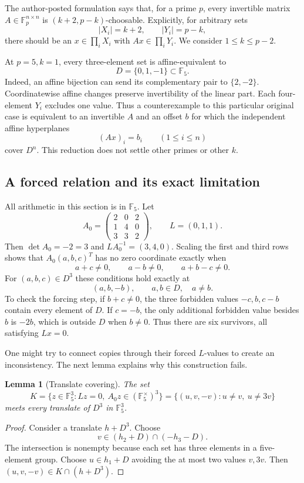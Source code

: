 \documentclass[11pt,a4paper]{article}
\newtheorem{lemma}[theorem]{Lemma}
\newcommand{\F}{\mathbb F_5}
\begin{document}
The author-posted formulation \cite{DeVos} says that, for a prime $p$,
every invertible matrix $A\in\mathbb F_p^{n\times n}$ is
$(k+2,p-k)$-choosable. Explicitly, for arbitrary sets
\[
 |X_i|=k+2,\qquad |Y_i|=p-k,
\]
there should be an $x\in\prod_i X_i$ with $Ax\in\prod_i Y_i$.
We consider $1\le k\le p-2$.

At $p=5,k=1$, every three-element set is affine-equivalent to
\[
 D=\{0,1,-1\}\subset\F.
\]
Indeed, an affine bijection can send its complementary pair to
$\{2,-2\}$. Coordinatewise affine changes preserve invertibility of the
linear part. Each four-element $Y_i$ excludes one value. Thus a
counterexample to this particular original case is equivalent to an
invertible $A$ and an offset $b$ for which the independent affine
hyperplanes
\[
 (Ax)_i=b_i\qquad(1\le i\le n)
\]
cover $D^n$. This reduction does not settle other primes or other $k$.

\subsection{A forced relation and its exact limitation}

All arithmetic in this section is in $\F$. Let
\begin{equation}\label{eq:gadget}
 A_0=\begin{pmatrix}2&0&2\\1&4&0\\3&3&2\end{pmatrix},
 \qquad L=(0,1,1).
\end{equation}
Then $\det A_0=-2=3$ and $LA_0^{-1}=(3,4,0)$.
Scaling the first and third rows shows that $A_0(a,b,c)^T$ has no zero
coordinate exactly when
\[
 a+c\ne0,\qquad a-b\ne0,\qquad a+b-c\ne0.
\]
For $(a,b,c)\in D^3$ these conditions hold exactly at
\begin{equation}\label{eq:six}
 (a,b,-b),\qquad a,b\in D,\quad a\ne b.
\end{equation}
To check the forcing step, if $b+c\ne0$, the three forbidden values
$-c,b,c-b$ contain every element of $D$. If $c=-b$, the only additional
forbidden value besides $b$ is $-2b$, which is outside $D$ when
$b\ne0$. Thus there are six survivors, all satisfying $Lx=0$.

One might try to connect copies through their forced $L$-values to create
an inconsistency. The next lemma explains why this construction fails.

\begin{lemma}[Translate covering]\label{lem:translate}
The set
\[
 K=\{z\in\F^3:Lz=0,\ A_0z\in(\F^\times)^3\}
   =\{(u,v,-v):u\ne v,\ u\ne3v\}
\]
meets every translate of $D^3$ in $\F^3$.
\end{lemma}
\begin{proof}
Consider a translate $h+D^3$. Choose
\[
 v\in(h_2+D)\cap(-h_3-D).
\]
The intersection is nonempty because each set has three elements in a
five-element group. Choose $u\in h_1+D$ avoiding the at most two values
$v,3v$. Then $(u,v,-v)\in K\cap(h+D^3)$.
\end{proof}
\end{document}
